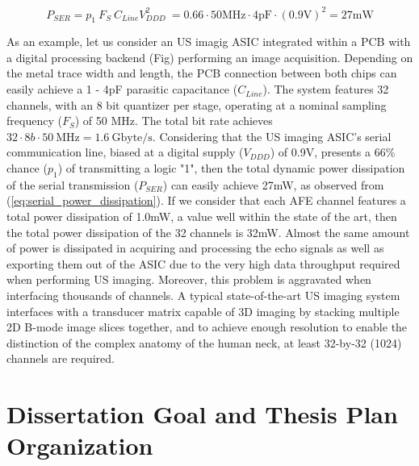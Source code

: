 \begin{equation}
  P_{SER} = p_1 \ F_S \ C_{Line} V_{DDD}^2 \ = 0.66 \cdot 50\mathrm{MHz} \cdot 4\mathrm{pF} \cdot {(0.9\mathrm{V})}^2 = 27\mathrm{mW}
  \label{eq:serial_power_dissipation}
\end{equation}

As an example, let us consider an US imagig ASIC integrated within a PCB with a digital processing backend (Fig) performing an image acquisition. Depending on the metal trace width and length, the PCB connection between both chips can easily achieve a 1 - 4pF parasitic capacitance ($C_{Line}$). The system features 32 channels, with an 8 bit quantizer per stage, operating at a nominal sampling frequency ($F_S$) of 50 MHz. The total bit rate achieves $32 \cdot 8b \cdot 50 \ \mathrm{MHz} = 1.6 \ \mathrm{Gbyte/s}$. Considering that the US imaging ASIC's serial communication line, biased at a digital supply ($V_{DDD}$) of 0.9V, presents a 66\% chance ($p_1$) of transmitting a logic "1", then the total dynamic power dissipation of the serial transmission ($P_{SER}$) can easily achieve 27mW, as observed from (\ref{eq:serial_power_dissipation}). If we consider that each AFE channel features a total power dissipation of 1.0mW, a value well within the state of the art, then the total power dissipation of the 32 channels is 32mW. Almost the same amount of power is dissipated in acquiring and processing the echo signals as well as exporting them out of the ASIC due to the very high data throughput required when performing US imaging. Moreover, this problem is aggravated when interfacing thousands of channels. A typical state-of-the-art US imaging system interfaces with a transducer matrix capable of 3D imaging by stacking multiple 2D B-mode image slices together, and to achieve enough resolution to enable the distinction of the complex anatomy of the human neck, at least 32-by-32 (1024) channels are required. 

\section{Dissertation Goal and Thesis Plan Organization}
\label{subsec:goal_and_organization}


